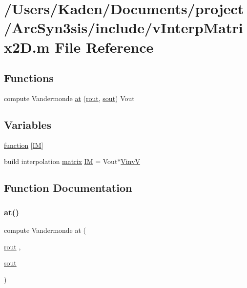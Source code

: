\hypertarget{a00560}{}\section{/\+Users/\+Kaden/\+Documents/project/\+Arc\+Syn3sis/include/v\+Interp\+Matrix2D.m File Reference}
\label{a00560}
\subsection*{Functions}
\begin{DoxyCompactItemize}
\item 
compute Vandermonde \hyperlink{a00560_a887f3ec6f2ead88f5c878fe6223927ea}{at} (\hyperlink{a00563_a2428903c9f57e3eba1ab8aa2ea4ad70b}{rout}, \hyperlink{a00563_af37c7e7d7baefebf97f9b18e437d3a0b}{sout}) Vout
\end{DoxyCompactItemize}
\subsection*{Variables}
\begin{DoxyCompactItemize}
\item 
\hyperlink{a00560_a42f883f7468418833529079bc0ce70a5}{function} \mbox{[}\hyperlink{a00560_a89faba2a84f07492f38e3ca6b80e84c7}{IM}\mbox{]}
\item 
build interpolation \hyperlink{a01014_af07ff1035f34d77764ff516f110e6832}{matrix} \hyperlink{a00560_a89faba2a84f07492f38e3ca6b80e84c7}{IM} = Vout$\ast$\hyperlink{a00473_a8ef32285093ff36729ef70bb1e8149c4}{VinvV}
\end{DoxyCompactItemize}


\subsection{Function Documentation}
\mbox{\label{a00560_a887f3ec6f2ead88f5c878fe6223927ea}} 
\subsubsection{\texorpdfstring{at()}{at()}}
{\footnotesize\ttfamily compute Vandermonde at (\begin{DoxyParamCaption}\item[{\hyperlink{a00563_a2428903c9f57e3eba1ab8aa2ea4ad70b}{rout}}]{,  }\item[{\hyperlink{a00563_af37c7e7d7baefebf97f9b18e437d3a0b}{sout}}]{ }\end{DoxyParamCaption})}



